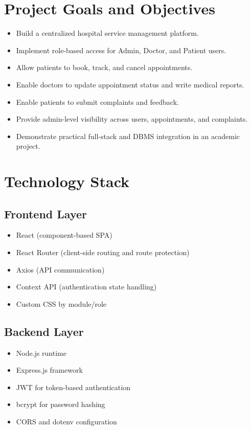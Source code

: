 \documentclass[12pt,a4paper]{article}
\begin{document}
\section{Project Goals and Objectives}
\begin{itemize}[leftmargin=1.2cm]
    \item Build a centralized hospital service management platform.
    \item Implement role-based access for Admin, Doctor, and Patient users.
    \item Allow patients to book, track, and cancel appointments.
    \item Enable doctors to update appointment status and write medical reports.
    \item Enable patients to submit complaints and feedback.
    \item Provide admin-level visibility across users, appointments, and complaints.
    \item Demonstrate practical full-stack and DBMS integration in an academic project.
\end{itemize}

\section{Technology Stack}
\subsection{Frontend Layer}
\begin{itemize}[leftmargin=1.2cm]
    \item React (component-based SPA)
    \item React Router (client-side routing and route protection)
    \item Axios (API communication)
    \item Context API (authentication state handling)
    \item Custom CSS by module/role
\end{itemize}

\subsection{Backend Layer}
\begin{itemize}[leftmargin=1.2cm]
    \item Node.js runtime
    \item Express.js framework
    \item JWT for token-based authentication
    \item bcrypt for password hashing
    \item CORS and dotenv configuration
\end{itemize}
\end{document}
